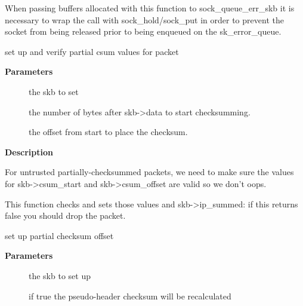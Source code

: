 \documentclass[a4paper,8pt,english]{sphinxmanual}
\begin{document}
When passing buffers allocated with this function to sock\_queue\_err\_skb
it is necessary to wrap the call with sock\_hold/sock\_put in order to
prevent the socket from being released prior to being enqueued on
the sk\_error\_queue.

\begin{fulllineitems}
\label{networking/kapi:c.skb_partial_csum_set}
set up and verify partial csum values for packet

\end{fulllineitems}


\textbf{Parameters}
\begin{description}
\item[{}] \leavevmode
the skb to set

\item[{}] \leavevmode
the number of bytes after skb-\textgreater{}data to start checksumming.

\item[{}] \leavevmode
the offset from start to place the checksum.

\end{description}

\textbf{Description}

For untrusted partially-checksummed packets, we need to make sure the values
for skb-\textgreater{}csum\_start and skb-\textgreater{}csum\_offset are valid so we don't oops.

This function checks and sets those values and skb-\textgreater{}ip\_summed: if this
returns false you should drop the packet.

\begin{fulllineitems}
\label{networking/kapi:c.skb_checksum_setup}
set up partial checksum offset

\end{fulllineitems}


\textbf{Parameters}
\begin{description}
\item[{}] \leavevmode
the skb to set up

\item[{}] \leavevmode
if true the pseudo-header checksum will be recalculated

\end{description}
\end{document}
